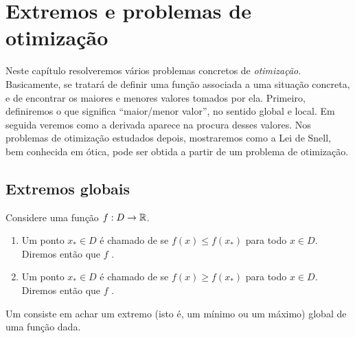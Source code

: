 

\chapter{Extremos e problemas de otimização}\label{Cap:Extremos}
  
\ifdefined\updateans
\fi


Neste capítulo resolveremos vários problemas concretos de \emph{otimização}. 
Basicamente, se tratará de definir uma função associada a uma situação
concreta, e de encontrar os maiores e menores valores tomados por
ela.
Primeiro, definiremos o que significa ``maior/menor valor'', no
sentido global e local. Em seguida veremos como a derivada aparece na
procura desses valores. Nos problemas de otimização estudados depois,
mostraremos como a Lei de Snell, bem conhecida em ótica, pode ser
obtida a partir de um problema de otimização.

\section{Extremos globais}

\begin{defin}
Considere uma função $f:D\to \mathbb{R}$.
\begin{enumerate}
\item Um ponto $x_*\in D$ é chamado de  se $f(x)\leq f(x_*)$ para todo $x\in D$.
Diremos então que $f$ .
\item Um ponto $x_*\in D$ é chamado de  se $f(x)\geq f(x_*)$ para todo $x\in D$.
Diremos então que $f$ .
\end{enumerate}
\end{defin}
Um  
consiste em achar um extremo (isto é, um mínimo ou
um máximo) global de uma função dada. 

